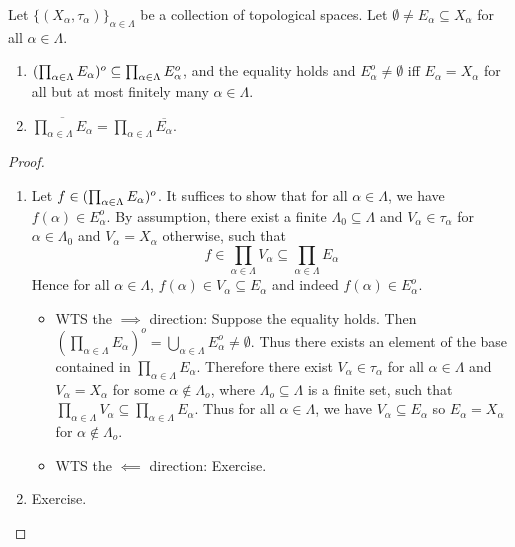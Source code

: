 \documentclass[screen,single]{techreport}
\numberwithin{equation}{section}
\begin{document}
\begin{proposition}\label{Prop:IntProdSubProdIntAndCloProdEqProdClo}
	Let $\{(X_\alpha,\tau_\alpha)\}_{\alpha \in \Lambda}$ be a collection of topological spaces.
	Let $\emptyset \neq E_\alpha \subseteq X_\alpha$ for all $\alpha \in \Lambda$.
	\begin{enumerate}
		\item $({\prod_{\alpha \in \Lambda} E_\alpha})^o \subseteq \prod_{\alpha \in \Lambda} E_\alpha^o$, and the equality holds and $E_\alpha^o \neq \emptyset$ iff $E_\alpha = X_\alpha$ for all but at most finitely many $\alpha \in \Lambda$.
		\item $\overline{\prod_{\alpha \in \Lambda} E_\alpha} = \prod_{\alpha \in \Lambda} \overline{E_\alpha}$.
	\end{enumerate}
\end{proposition}
\begin{proof}\
	\begin{enumerate}
		\item Let $f \in ({\prod_{\alpha \in \Lambda} E_\alpha})^o$.
		It suffices to show that for all $\alpha \in \Lambda$, we have $f(\alpha) \in E_\alpha^o$.
		By assumption, there exist a finite $\Lambda_0 \subseteq \Lambda$ and $V_\alpha \in \tau_\alpha$ for $\alpha \in \Lambda_0$ and $V_\alpha = X_\alpha$ otherwise, such that
		\[
		f \in \prod_{\alpha \in \Lambda} V_\alpha \subseteq \prod_{\alpha \in \Lambda} E_\alpha
		\]
		Hence for all $\alpha \in \Lambda$, $f(\alpha) \in V_\alpha \subseteq E_\alpha$ and indeed $f(\alpha) \in E_\alpha^o$.
		
		\begin{itemize}
		  \item WTS the $\implies$ direction: Suppose the equality holds. Then $(\prod_{\alpha\in\Lambda} E_\alpha)^o = \bigcup_{\alpha \in \Lambda} E_\alpha^o \neq  \emptyset$.
		  Thus there exists an element of the base contained in $\prod_{\alpha\in\Lambda} E_\alpha$.
		  Therefore there exist $V_\alpha \in \tau_\alpha$ for all $\alpha\in\Lambda$ and $V_\alpha = X_\alpha$ for some $\alpha \not\in \Lambda_o$, where $\Lambda_o \subseteq \Lambda$ is a finite set, such that $\prod_{\alpha\in\Lambda} V_\alpha \subseteq \prod_{\alpha\in\Lambda} E_\alpha$.
		  Thus for all $\alpha\in\Lambda$, we have $V_\alpha \subseteq E_\alpha$ so $E_\alpha = X_\alpha$ for $\alpha\not\in\Lambda_o$.
		  
		  \item WTS the $\impliedby$ direction: Exercise.
		\end{itemize}
		
		\item Exercise.
	\end{enumerate}
\end{proof}
\end{document}
